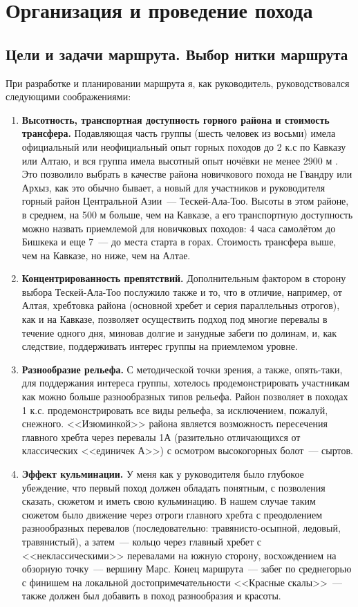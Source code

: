 \section{Организация и проведение похода}
\subsection{Цели и задачи маршрута. Выбор нитки маршрута}
При разработке и планировании маршрута я, как руководитель, руководствовался следующими соображениями:
\begin{enumerate} 
	\item \textbf{Высотность, транспортная доступность горного района и стоимость трансфера.}
	Подавляющая часть группы (шесть человек из восьми) имела официальный или неофициальный опыт горных походов до 2 к.с по Кавказу \cite{Snegovskaya2024} или Алтаю, и вся группа имела высотный опыт ночёвки не менее 2900 м \cite{ostapiv2025}. Это позволило выбрать в качестве района новичкового похода не Гвандру или Архыз, как это обычно бывает, а новый для участников и руководителя горный район Центральной Азии~--- Тескей-Ала-Тоо. Высоты в этом районе, в среднем, на 500 м больше, чем на Кавказе, а его транспортную доступность можно назвать приемлемой для новичковых походов: 4 часа самолётом до Бишкека и еще 7~--- до места старта в горах. Стоимость трансфера выше, чем на Кавказе, но ниже, чем на Алтае. 
		
	\item \textbf{Концентрированность препятствий.}
	Дополнительным фактором в сторону выбора Тескей-Ала-Тоо послужило также и то, что в отличие, например, от Алтая, хребтовка района (основной хребет и серия параллельныз отрогов), как и на Кавказе, позволяет осуществить подход под многие перевалы в течение одного дня, миновав долгие и занудные забеги по долинам, и, как следствие, поддерживать интерес группы на приемлемом уровне.
	
	\item \textbf{Разнообразие рельефа.} 
	С методической точки зрения, а также, опять-таки, для поддержания интереса группы, хотелось продемонстрировать участникам как можно больше разнообразных типов рельефа. Район позволяет в походах 1 к.с. продемонстрировать все виды рельефа, за исключением, пожалуй, снежного. <<Изюминкой>> района является возможность пересечения главного хребта через перевалы 1А (разительно отличающихся от классических <<единичек А>>) с осмотром высокогорных болот~--- сыртов.
	
	\item \textbf{Эффект кульминации.}
	У меня как у руководителя было глубокое убеждение, что первый поход должен обладать понятным, с позволения сказать, сюжетом и иметь свою кульминацию. В нашем случае таким сюжетом было движение через отроги главного хребта с преодолением разнообразных перевалов (последовательно: травянисто-осыпной, ледовый, травянистый), а затем~--- кольцо через главный хребет с <<неклассическими>> перевалами на южную сторону, восхождением на обзорную точку~--- вершину Марс. Конец маршрута~--- забег по среднегорью с финишем на локальной достопримечательности <<Красные скалы>>~--- также должен был добавить в поход разнообразия и красоты.
	

\end{enumerate}
